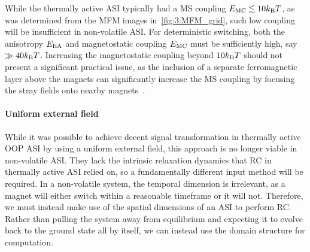 
While the thermally active ASI typically had a MS coupling $\EMC \lesssim 10\kBT$, as was determined from the MFM images in~\cref{fig:3:MFM_grid}, such low coupling will be insufficient in non-volatile ASI.
For deterministic switching, both the anisotropy $E_\mathrm{EA}$ and magnetostatic coupling $E_\mathrm{MC}$ must be sufficiently high, say $\gg 40 \kBT$.
Increasing the magnetostatic coupling beyond $10\kBT$ should not present a significant practical issue, as the inclusion of a separate ferromagnetic layer above the magnets can significantly increase the MS coupling by focusing the stray fields onto nearby magnets~\cite[Supp. 10]{KUR-24}.

\paragraph{Uniform external field}
While it was possible to achieve decent signal transformation in thermally active OOP ASI by using a uniform external field, this approach is no longer viable in non-volatile ASI.
They lack the intrinsic relaxation dynamics that RC in thermally active ASI relied on, so a fundamentally different input method will be required.
In a non-volatile system, the temporal dimension is irrelevant, as a magnet will either switch within a reasonable timeframe or it will not.
Therefore, we must instead make use of the spatial dimensions of an ASI to perform RC.
Rather than pulling the system away from equilibrium and expecting it to evolve back to the ground state all by itself, we can instead use the domain structure for computation.

